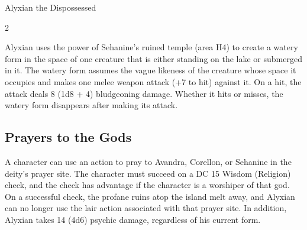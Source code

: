 \documentclass[10pt,a4paper,twoside,bg=none,twocolumn,openany,nodeprecatedcode]{dndbook}
\begin{document}
\begin{DndMonster}[float*=b,width=\textwidth + 8pt]{Alyxian the Dispossessed}
\begin{multicols}{2}
\begin{description}[nolistsep]
\item[Sehanine's Torment]
Alyxian uses the power of Sehanine's ruined temple (area H4) to create a watery form in the space of one creature that is either standing on the lake or submerged in it. The watery form assumes the vague likeness of the creature whose space it occupies and makes one melee weapon attack (+7 to hit) against it. On a hit, the attack deals 8 (1d8 + 4) bludgeoning damage. Whether it hits or misses, the watery form disappears after making its attack.

\end{description}

\subsection{Prayers to the Gods}
A character can use an action to pray to Avandra, Corellon, or Sehanine in the deity's prayer site. The character must succeed on a DC 15 Wisdom (Religion) check, and the check has advantage if the character is a worshiper of that god. On a successful check, the profane ruins atop the island melt away, and Alyxian can no longer use the lair action associated with that prayer site. In addition, Alyxian takes 14 (4d6) psychic damage, regardless of his current form.

\end{multicols}
\end{DndMonster}
\end{document}
